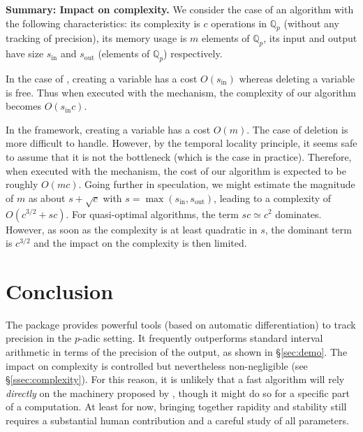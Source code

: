 \documentclass[sigconf]{acmart}
\newcommand{\Q}{\mathbb Q}
\newcommand{\Qp}{\Q_p}
\newcommand{\ZpL}{\text{\color{output} \rm \tt ZpL}\xspace}
\newcommand{\ZpLC}{\text{\color{output} \rm \tt ZpLC}\xspace}
\newcommand{\ZpLF}{\text{\color{output} \rm \tt ZpLF}\xspace}
\newcommand{\inp}{\text{in}}
\newcommand{\out}{\text{out}}
\theoremstyle{definition}
\begin{document}
\medskip

\noindent \textbf{Summary: Impact on complexity.}
% 
We consider the case of an algorithm with the following characteristics: 
its complexity is $c$ operations in $\Qp$ (without any tracking of 
precision), its memory usage is $m$ elements of $\Qp$, its input and 
output have size $s_\inp$ and $s_\out$ (elements of $\Qp$) respectively.

In the case of \ZpLF, creating a variable has a cost $O(s_\inp)$ 
whereas deleting a variable is free. 
Thus when executed with the \ZpLF mechanism, the complexity of our
algorithm becomes $O(s_\inp c)$.

In the \ZpLC framework, creating a variable has a cost $O(m)$. The case 
of deletion is more difficult to handle. However, by the temporal 
locality principle, it seems safe to assume that it is not the 
bottleneck (which is the case in practice). Therefore, when executed 
with the \ZpLF mechanism, the cost of our algorithm is expected to be 
roughly $O(mc)$. Going further in speculation, we might estimate the 
magnitude of $m$ as about $s + \sqrt c$ with $s = \max(s_\inp, 
s_\out)$, leading to a complexity of $O(c^{3/2} + sc)$. For 
quasi-optimal algorithms, the term $sc \simeq c^2$ dominates. However, 
as soon as the complexity is at least quadratic in $s$, the dominant 
term is $c^{3/2}$ and the impact on the complexity is then limited.

\section{Conclusion}
\label{sec:conclusion}

The package \ZpL provides powerful tools (based on automatic 
differentiation) to track precision in the $p$-adic setting.
It frequently outperforms standard interval arithmetic in terms of the
precision of the output, as shown in \S \ref{sec:demo}.
The impact on complexity is controlled but nevertheless non-negligible 
(see \S \ref{ssec:complexity}). For this reason, it is unlikely that a fast
algorithm will rely \emph{directly} on the machinery proposed by \ZpL,
though it might do so for a specific part of a computation.
At least for now, bringing together rapidity and stability
still requires a substantial human contribution 
and a careful study of all parameters.
\end{document}
